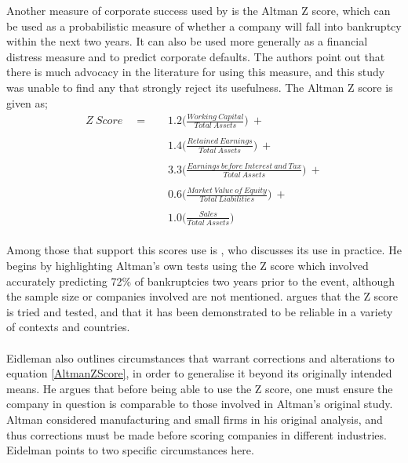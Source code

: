{Another measure of corporate success used by \cite{moldovan2015learning} is the Altman Z score, which can be used as a probabilistic measure of whether a company will fall into bankruptcy within the next two years. It can also be used more generally as a financial distress measure and to predict corporate defaults. The authors point out that there is much advocacy in the literature for using this measure, and this study was unable to find any that strongly reject its usefulness. The Altman Z score is given as;
\begin {equation}\label{AltmanZScore}
\begin{aligned}
Z \ Score \quad = \quad & 1.2\bigg(\frac{Working \ Capital}{Total \ Assets}\bigg) \ + \\\\
		& 1.4\bigg({\frac{Retained \ Earnings}{Total \ Assets}}\bigg) \ + \\\\
		& 3.3\bigg({\frac{Earnings \ before \ Interest \ and \ Tax}{Total \ Assets}}\bigg) \ + \\\\
		& 0.6\bigg({\frac{Market \ Value \ of \ Equity}{Total \ Liabilities}}\bigg) \ + \\\\
		& 1.0\bigg({\frac{Sales}{Total \ Assets}}\bigg)
\end{aligned}
\end{equation}\\
Among those that support this scores use is \cite {eidleman1995z}, who discusses its use in practice. He begins by highlighting Altman's own tests using the Z score which involved accurately predicting 72\% of bankruptcies two years prior to the event, although the sample size or companies involved are not mentioned. \cite {eidleman1995z} argues that the Z score is tried and tested, and that it has been demonstrated to be reliable in a variety of contexts and countries.\\\\
Eidleman also outlines circumstances that warrant corrections and alterations to equation \ref{AltmanZScore}, in order to generalise it beyond its originally intended means. He argues that before being able to use the Z score, one must ensure the company in question is comparable to those involved in Altman's original study. Altman considered manufacturing and small firms in his original analysis, and thus corrections must be made before scoring companies in different industries. Eidelman points to two specific circumstances here. \\\\
}
